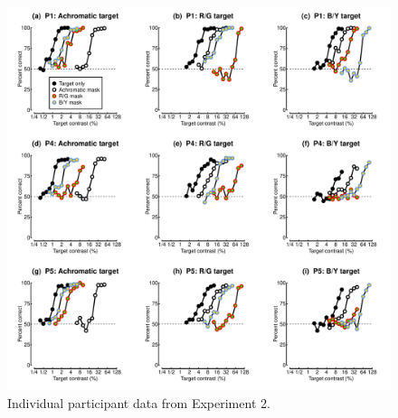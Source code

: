 \documentclass[
]{article}
\begin{document}
\begin{figure}

{\centering \includegraphics{Figures/individualMCS} 

}

\caption{Individual participant data from Experiment 2.}\label{fig:individualMCS}
\end{figure}
\end{document}
